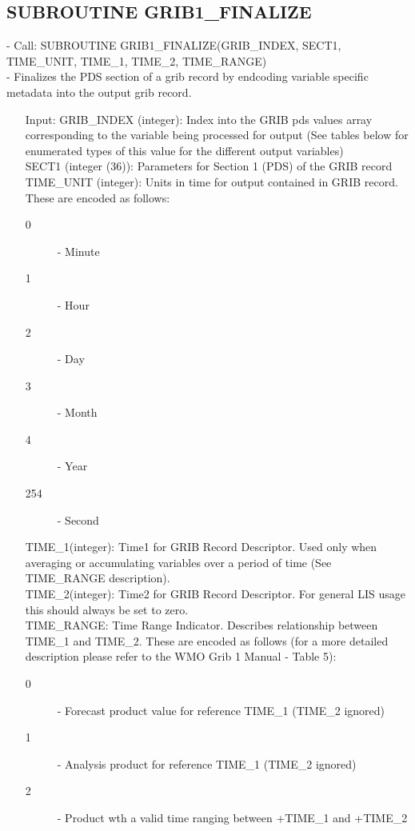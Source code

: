 \subsection{ SUBROUTINE GRIB1\_FINALIZE }
- Call: SUBROUTINE GRIB1\_FINALIZE(GRIB\_INDEX, SECT1, TIME\_UNIT, TIME\_1,
  TIME\_2, TIME\_RANGE) \\
- Finalizes the PDS section of a grib record by endcoding variable specific
  metadata into the output grib record. \\
\begin{itemize}
 \item[ Input:]
    GRIB\_INDEX (integer): Index into the GRIB pds values array corresponding
    to the variable being processed for output (See tables below for
    enumerated types of this value for the different output variables)  \\
    SECT1 (integer (36)): Parameters for Section 1 (PDS) of the GRIB record \\
    TIME\_UNIT (integer): Units in time for output contained in GRIB record.
    These are encoded as follows:
    \begin{description}
      \item[0] - Minute
      \item[1] - Hour
      \item[2] - Day
      \item[3] - Month
      \item[4] - Year
      \item[254] - Second
    \end{description}
    TIME\_1(integer): Time1 for GRIB Record Descriptor.  Used only when
    averaging or accumulating variables over a period of time (See TIME\_RANGE
    description). \\
    TIME\_2(integer): Time2 for GRIB Record Descriptor.  For general LIS usage
    this should always be set to zero. \\
    TIME\_RANGE: Time Range Indicator.  Describes relationship between TIME\_1
    and TIME\_2.  These are encoded as follows (for a more detailed description
    please refer to the WMO Grib 1 Manual - Table 5):
    \begin{description}
      \item[0] - Forecast product value for reference TIME\_1 (TIME\_2 ignored)
      \item[1] - Analysis product for reference TIME\_1 (TIME\_2 ignored)
      \item[2] - Product wth a valid time ranging between +TIME\_1 and +TIME\_2

\end{description}
\end{itemize}
